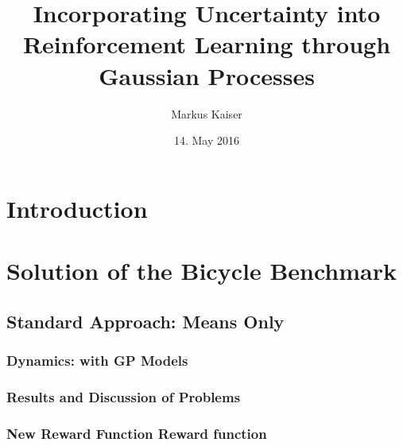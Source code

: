 




\date{14. May 2016}
\title{Incorporating Uncertainty into Reinforcement Learning through Gaussian Processes}
\author{Markus Kaiser}




\frontmatter
\maketitle



\tableofcontents
\listoftodos

\mainmatter

\chapter{Introduction}




\chapter{Solution of the Bicycle Benchmark}
\section{Standard Approach: Means Only}
\subsection{Dynamics: with GP Models}
\subsection{Results and Discussion of Problems}
\subsection{New Reward Function Reward function}
